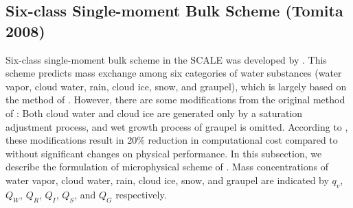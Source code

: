 \subsection{Six-class Single-moment Bulk Scheme (Tomita 2008)}
Six-class single-moment bulk scheme in the SCALE was developed by \citet{tomita_2008}. This scheme predicts mass exchange among six categories of water substances (water vapor, cloud water, rain, cloud ice, snow, and graupel), which is largely based on the method of \citet{lin_etal_1983}. However, there are some modifications from the original method of \citet{lin_etal_1983}: Both cloud water and cloud ice are generated only by a saturation adjustment process, and wet growth process of graupel is omitted. According to \citet{tomita_2008}, these modifications result in 20\% reduction in computational cost compared to \citet{lin_etal_1983} without significant changes on physical performance. In this subsection, we describe the formulation of microphysical scheme of \citet{tomita_2008}. Mass concentrations of water vapor, cloud water, rain, cloud ice, snow, and graupel are indicated by $q_{v}$, $Q_{W}$, $Q_{R}$, $Q_{I}$, $Q_{S}$, and $Q_{G}$ respectively.


